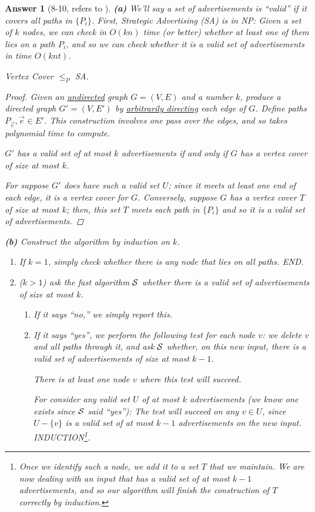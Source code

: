 \documentclass[11pt]{article}
\theoremstyle{numberplain}
\theoremstyle{nonumberplain}
\newtheorem{proof}{Proof}
\newtheorem{ans}{Answer}
\newcommand{\0}{{\mathbf{0}}}
\begin{document}
\begin{ans}[8-10, refers to \cite{solcornell}]

{\bf (a)} 
We'll say a set of advertisements is ``valid'' if 
it covers all paths in $\{P_i\}$.
First, {\sc Strategic Advertising} (SA) is in NP: Given a set of $k$
nodes, we can check in $O(kn)$ time (or better) whether 
at least one of them lies on a path $P_i$, and so we can check whether it is
a valid set of advertisements in time $O(knt)$.

\begin{State}[Claim 1]
{\sc Vertex Cover} $\leq_P$ SA.
\end{State}
\begin{proof}
Given an \underline{undirected} graph $G = (V,E)$ and a number $k$,
produce a directed graph $G' = (V,E')$ by \underline{arbitrarily directing}
each edge of $G$.
Define paths $P_{\vec{e}},\vec{e}\in E'$.
This construction involves one pass over the edges,
and so takes polynomial time to compute.
\begin{State}[Claim 2]
 $G'$ has a valid set of at most $k$ advertisements
if and only if $G$ has a vertex cover of size at most $k$.
\end{State}
For suppose $G'$ does have such a valid set $U$; since it 
meets at least one end of each edge, it is a vertex cover for $G$.
Conversely, suppose $G$ has a vertex cover $T$ of size at most $k$;
then, this set $T$ meets each path in $\{P_i\}$ and so it is
a valid set of advertisements.
\end{proof}
{\bf (b)}
Construct the algorithm by induction on $k$.
\begin{enumerate}
\item If $k = 1$, simply check whether there is any node
that lies on all paths. END.
\item ($k>1$) ask the fast algorithm $\cal S$ whether
there is a valid set of advertisements of size at most $k$.
\begin{enumerate}
\item If it says ``no,'' we simply report this.
\item If it says ``yes'', we perform the following test for each node $v$:
we delete $v$ and all paths through it, and ask $\cal S$
whether, on this new input, there is a valid set of advertisements
of size at most $k-1$.
\begin{State}[Claim 3]
There is at least one node $v$ where this
test will succeed. 
\end{State}
 For consider any valid set $U$
of at most $k$ advertisements (we know one exists since
$\cal S$ said ``yes''): The test will succeed on any $v \in U$,
since $U - \{v\}$ is a valid set of at most $k-1$ advertisements
on the new input. INDUCTION\footnote{Once we identify such a node, we add it to a set $T$ that we maintain.
We are now dealing with an
input that has a valid set of at most $k-1$ advertisements,
and so our algorithm will finish the construction of $T$
correctly by induction.}.
\end{enumerate}
\end{enumerate}


\end{ans}
\end{document}
